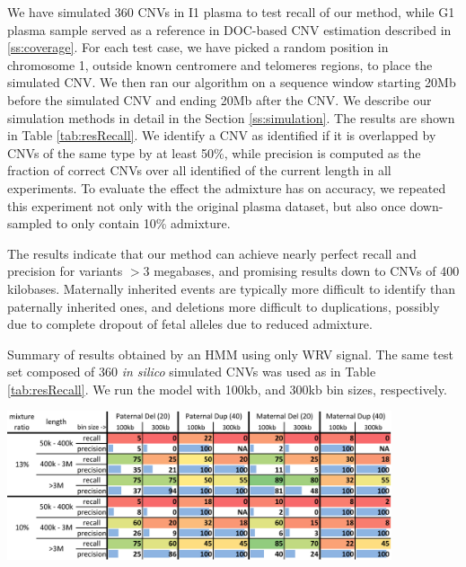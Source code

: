We have simulated 360 CNVs in I1 plasma to test recall of our method, while G1 plasma sample served as a reference in DOC-based CNV estimation described in \ref{ss:coverage}. For each test case, we have picked a random position in chromosome 1, outside known centromere and telomeres regions, to place the simulated CNV.  We then ran our algorithm on a sequence window starting 20Mb before the simulated CNV and ending 20Mb after the CNV.  We describe our simulation methods in detail in the Section \ref{ss:simulation}. The results are shown in Table \ref{tab:resRecall}. We identify a CNV as identified if it is overlapped by CNVs of the same type by at least 50\%, while precision is computed as the fraction of correct CNVs over all identified of the current length in all experiments. To evaluate the effect the admixture has on accuracy, we repeated this experiment not only with the original plasma dataset, but also once down-sampled to only contain 10\% admixture.

The results indicate that our method can achieve nearly perfect recall and precision for variants $>3$ megabases, and promising results down to CNVs of 400 kilobases.  Maternally inherited events are typically more difficult to identify than paternally inherited ones, and deletions more difficult to duplications, possibly due to complete dropout of fetal alleles due to reduced admixture.

\begin{table}
\caption{Summary of results obtained by an HMM using only WRV signal. The same test set composed of 360 \emph{in silico} simulated CNVs was used as in Table \ref{tab:resRecall}. We run the model with 100kb, and 300kb bin sizes, respectively.}
\label{tab:resWRV}
\centering
\includegraphics[width=0.85\textwidth]{figures/ismb_wrv_res_color}
\end{table}

